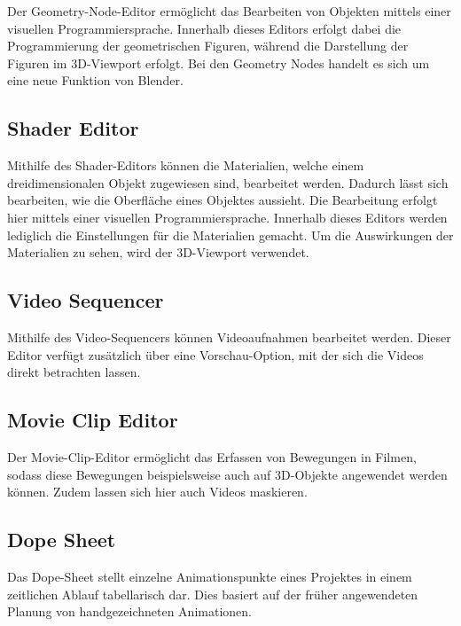 \documentclass[
]{book}
\let\oldmarginnote\marginnote
\renewcommand{\marginnote}[1]{%
  \oldmarginnote{{\footnotesize\selectfont #1}}%
}
\begin{document}
Der Geometry-Node-Editor ermöglicht das Bearbeiten von Objekten mittels
einer visuellen Programmiersprache. Innerhalb dieses Editors erfolgt
dabei die Programmierung der geometrischen Figuren, während die
Darstellung der Figuren im 3D-Viewport erfolgt. Bei den Geometry Nodes
handelt es sich um eine neue Funktion von Blender.

\subsection{Shader Editor}\label{shader-editor}

Mithilfe des Shader-Editors können die Materialien, welche einem
dreidimensionalen Objekt zugewiesen sind, bearbeitet werden. Dadurch
lässt sich bearbeiten, wie die Oberfläche eines Objektes aussieht. Die
Bearbeitung erfolgt hier mittels einer visuellen Programmiersprache.
Innerhalb dieses Editors werden lediglich die Einstellungen für die
Materialien gemacht. Um die Auswirkungen der Materialien zu sehen, wird
der 3D-Viewport verwendet.

\subsection{Video Sequencer}\label{video-sequencer}

Mithilfe des Video-Sequencers können Videoaufnahmen bearbeitet werden.
Dieser Editor verfügt zusätzlich über eine Vorschau-Option, mit der sich
die Videos direkt betrachten lassen.

\subsection{Movie Clip Editor}\label{movie-clip-editor}

Der Movie-Clip-Editor ermöglicht das Erfassen von Bewegungen in Filmen,
sodass diese Bewegungen beispielsweise auch auf 3D-Objekte angewendet
werden können. Zudem lassen sich hier auch Videos maskieren.

\subsection{Dope Sheet}\label{dope-sheet}

\marginnote{Editoren für Animationen}

Das Dope-Sheet stellt einzelne Animationspunkte eines Projektes in einem
zeitlichen Ablauf tabellarisch dar. Dies basiert auf der früher
angewendeten Planung von handgezeichneten Animationen.
\end{document}

